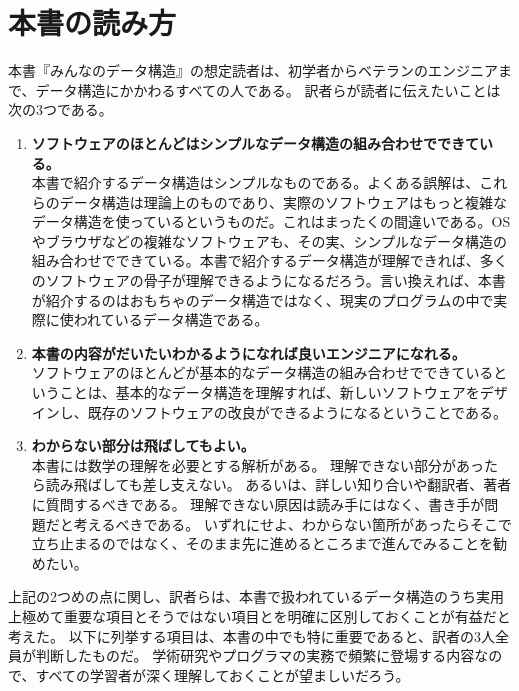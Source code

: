 
\section*{本書の読み方}

本書『みんなのデータ構造』の想定読者は、初学者からベテランのエンジニアまで、データ構造にかかわるすべての人である。
訳者らが読者に伝えたいことは次の3つである。

\begin{enumerate}
\item {\bf ソフトウェアのほとんどはシンプルなデータ構造の組み合わせでできている。} \\
本書で紹介するデータ構造はシンプルなものである。よくある誤解は、これらのデータ構造は理論上のものであり、実際のソフトウェアはもっと複雑なデータ構造を使っているというものだ。これはまったくの間違いである。OSやブラウザなどの複雑なソフトウェアも、その実、シンプルなデータ構造の組み合わせでできている。本書で紹介するデータ構造が理解できれば、多くのソフトウェアの骨子が理解できるようになるだろう。言い換えれば、本書が紹介するのはおもちゃのデータ構造ではなく、現実のプログラムの中で実際に使われているデータ構造である。%

\item {\bf 本書の内容がだいたいわかるようになれば良いエンジニアになれる。} \\
ソフトウェアのほとんどが基本的なデータ構造の組み合わせでできているということは、基本的なデータ構造を理解すれば、新しいソフトウェアをデザインし、既存のソフトウェアの改良ができるようになるということである。

\item {\bf わからない部分は飛ばしてもよい。} \\
本書には数学の理解を必要とする解析がある。
理解できない部分があったら読み飛ばしても差し支えない。
あるいは、詳しい知り合いや翻訳者、著者に質問するべきである。
理解できない原因は読み手にはなく、書き手が問題だと考えるべきである。
いずれにせよ、わからない箇所があったらそこで立ち止まるのではなく、そのまま先に進めるところまで進んでみることを勧めたい。

\end{enumerate}

上記の2つめの点に関し、訳者らは、本書で扱われているデータ構造のうち実用上極めて重要な項目とそうではない項目とを明確に区別しておくことが有益だと考えた。
以下に列挙する項目は、本書の中でも特に重要であると、訳者の3人全員が判断したものだ。
学術研究やプログラマの実務で頻繁に登場する内容なので、すべての学習者が深く理解しておくことが望ましいだろう。

